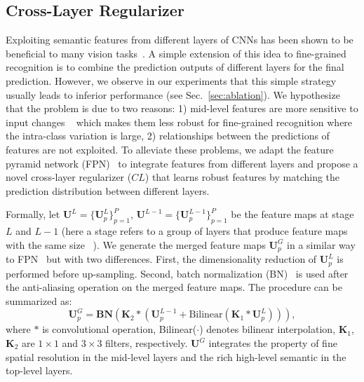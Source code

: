 \documentclass[10pt,twocolumn,letterpaper]{article}
\begin{document}
\subsection{Cross-Layer Regularizer}
\label{sec:clr}
Exploiting  semantic features from different layers of CNNs has been shown to be beneficial to many vision tasks~\cite{fcn15darrell,hypercolumn15girshick,hypernet16kong,ssd16szegedy,mscnn16cai}. A simple extension of this idea to fine-grained recognition is to combine the prediction outputs of different layers for the final prediction.
However, we observe in our experiments that this simple strategy usually leads to inferior performance (see Sec.~\ref{sec:ablation}). 
We hypothesize that the problem is due to two reasons: 1) mid-level features are more sensitive to input changes ~\cite{understanding_CNNs14lecun} which makes them less robust for fine-grained recognition where the intra-class variation is large,
2) relationships between the predictions of  features are not exploited.
To alleviate these problems, we adapt the feature pyramid network (FPN)~\cite{fpn17kaiming} to integrate features from different layers and propose a novel cross-layer regularizer ($CL$) that learns robust  features by matching the prediction distribution between different layers.


Formally, let $\mathbf{U}^{L}=\{\mathbf{U}_p^L\}_{p=1}^P$, $\mathbf{U}^{L-1}=\{\mathbf{U}_p^{L-1}\}_{p=1}^P$ be the feature maps at stage $L$ and $L-1$ (here a stage refers to a group of layers that produce feature maps with the same size ~\cite{resnet16kaiming}).
We generate the merged feature maps $\mathbf{U}_p^G$ in a similar way to FPN~\cite{fpn17kaiming} but with two differences.
First, the dimensionality reduction of $\mathbf{U}_p^L$ is performed before up-sampling.
Second, batch normalization (BN)~\cite{bn15Szegedy} is used after the anti-aliasing operation on the merged feature maps. The procedure can be summarized as:
\begin{equation}
\mathbf{U}_p^G = \mathbf{BN}\left (\mathbf{K}_2 \ast \left (\mathbf{U}_p^{L-1}+\text{Bilinear}(\mathbf{K}_1 \ast \mathbf{U}_p^L) \right ) \right ),
\end{equation}
where $\ast$ is convolutional operation, Bilinear($\cdot$) denotes bilinear interpolation, $\mathbf{K}_1$, $\mathbf{K}_2$ are $1\times 1$ and $3\times 3$ filters, respectively. 
$\mathbf{U}^G$ integrates the property of fine spatial resolution in the mid-level layers and the rich high-level semantic in the top-level layers.
\end{document}
